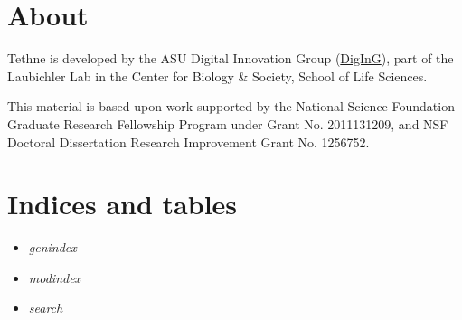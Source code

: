 \documentclass[letterpaper,10pt,english]{sphinxmanual}
\begin{document}
\chapter{About}
\label{index:about}
Tethne is developed by the ASU Digital Innovation Group (\href{http://devo-evo.lab.asu.edu/diging}{DigInG}), part of the Laubichler
Lab in the Center for Biology \& Society, School of Life Sciences.

This material is based upon work supported by the National Science Foundation Graduate
Research Fellowship Program under Grant No. 2011131209, and NSF Doctoral Dissertation
Research Improvement Grant No. 1256752.


\chapter{Indices and tables}
\label{index:indices-and-tables}\begin{itemize}
\item {} 
\emph{genindex}

\item {} 
\emph{modindex}

\item {} 
\emph{search}

\end{itemize}
\end{document}
